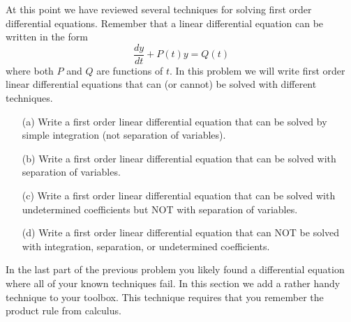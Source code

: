 \begin{problem}
    At this point we have reviewed several techniques for solving first order differential
    equations.  Remember that a linear differential equation can be written in the form
    \[ \frac{dy}{dt} + P(t) y = Q(t) \]
    where both $P$ and $Q$ are functions of $t$. In this problem we will write first order
    linear differential equations that can (or cannot) be solved with different
    techniques.
    \begin{enumerate}
        \item[(a)] Write a first order linear differential equation that can be solved
            by simple integration (not separation of variables).  
        \item[(b)] Write a first order linear differential equation that can be solved
            with separation of variables.
        \item[(c)] Write a first order linear differential equation that can be solved
            with undetermined coefficients but NOT with separation of variables.
        \item[(d)] Write a first order linear differential equation that can NOT be
            solved with integration, separation, or undetermined coefficients.
    \end{enumerate}
\end{problem}

In the last part of the previous problem you likely found a differential equation where
all of your known techniques fail.  In this section we add a rather handy technique to
your toolbox.  This technique requires that you remember the product rule from calculus.

